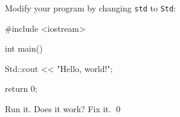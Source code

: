 Modify your program by changing \verb!std! to \verb!Std!:
\begin{console}
#include <iostream>

int main()
{
    Std::cout << "Hello, world!\n";

    return 0;
}
\end{console}
Run it. Does it work? Fix it.
\qed
